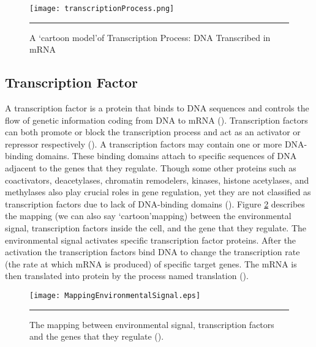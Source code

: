 \begin{figure}%
	\centering
		\texttt{[image: transcriptionProcess.png]}
		\rule{35em}{0.5pt}
	\caption{A \lq cartoon model\rq of Transcription Process: DNA Transcribed in mRNA}
	\label{fig:transcriptionProcess}
\end{figure}

\subsection{Transcription Factor}
A transcription factor is a protein that binds to DNA sequences and controls the flow of genetic information coding from DNA to mRNA (\cite{karin:1990, Latchman:1997}). Transcription factors can both promote or block the transcription process and act as an activator or repressor respectively (\cite{Lee:2000, Nikolov:1997, Roeder:1996}). A transcription factors may contain one or more DNA-binding domains. These binding domains attach to specific sequences of DNA adjacent to the genes that they regulate. Though some other proteins such as coactivators, deacetylases, chromatin remodelers, kinases, histone acetylases, and methylases also play crucial roles in gene regulation, yet they are not classified as transcription factors due to lack of DNA-binding domains (\cite{Mitchell:1989, Ptashne:1997, Brivanlou:2002}). Figure \ref{fig:MappingEnvironmentalSignal} describes the mapping (we can also say \lq cartoon\rq mapping) between the environmental signal, transcription factors inside the cell, and the gene that they regulate. The environmental signal activates specific transcription factor proteins. After the activation the transcription factors bind DNA to change the transcription rate (the rate at which mRNA is produced) of specific target genes. The mRNA is then translated into protein by the process named translation (\cite{Alon:2006}). 

\begin{figure}%
	\centering
		\texttt{[image: MappingEnvironmentalSignal.eps]}
		\rule{35em}{0.5pt}
	\caption[The mapping between environmental signal, transcription factors and the genes that they regulate]{The mapping between environmental signal, transcription factors and the genes that they regulate (\cite{Alon:2006}).}
	\label{fig:MappingEnvironmentalSignal}
\end{figure}

